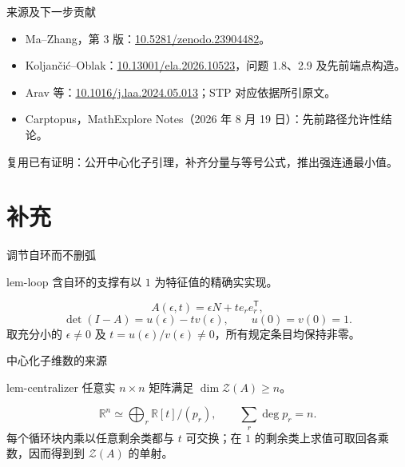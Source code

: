 \documentclass{beamer}
\begin{document}
\begin{frame}{来源及下一步贡献}
\small
\begin{itemize}
\item Ma--Zhang，第 3 版：\href{https://doi.org/10.5281/zenodo.23904482}{10.5281/zenodo.23904482}。
\item Koljančić--Oblak：\href{https://doi.org/10.13001/ela.2026.10523}{10.13001/ela.2026.10523}，问题 1.8、2.9 及先前端点构造。
\item Arav 等：\href{https://doi.org/10.1016/j.laa.2024.05.013}{10.1016/j.laa.2024.05.013}；STP 对应依据所引原文。
\item Carptopus，MathExplore Notes（2026 年 8 月 19 日）：先前路径允许性结论。
\end{itemize}
\normalsize 复用已有证明：公开中心化子引理，补齐分量与等号公式，推出强连通最小值。
\end{frame}
\appendix
\section{补充}
\begin{frame}{调节自环而不删弧}
\begin{bookresult}{lem-loop}
含自环的支撑有以 $1$ 为特征值的精确实实现。
\end{bookresult}
\[
 A(\epsilon,t)=\epsilon N+t e_re_r^{\mathsf T},
\]
\[
 \det(I-A)=u(\epsilon)-t v(\epsilon),\qquad u(0)=v(0)=1.
\]
取充分小的 $\epsilon\ne0$ 及 $t=u(\epsilon)/v(\epsilon)\ne0$，所有规定条目均保持非零。
\end{frame}
\begin{frame}{中心化子维数的来源}
\begin{bookresult}{lem-centralizer}
任意实 $n\times n$ 矩阵满足 $\dim\mathcal Z(A)\geq n$。
\end{bookresult}
\[
 \mathbb R^n\simeq\bigoplus_r\mathbb R[t]/(p_r),\qquad
 \sum_r\deg p_r=n.
\]
每个循环块内乘以任意剩余类都与 $t$ 可交换；在 $1$ 的剩余类上求值可取回各乘数，因而得到到 $\mathcal Z(A)$ 的单射。
\end{frame}
\FormalVerification
\end{document}
